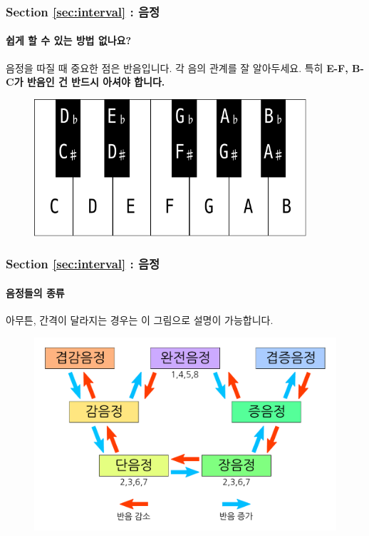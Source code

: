 \documentclass{beamer}
\begin{document}
	\begin{frame}
		\frametitle{Section \ref{sec:interval} : 음정}
		\framesubtitle{쉽게 할 수 있는 방법 없나요?}
		음정을 따질 때 중요한 점은 반음입니다. 각 음의 관계를 잘 알아두세요. 특히 {\bf E-F, B-C가 반음인 건 반드시 아셔야 합니다.}
		\begin{figure}
			\centering
			\includegraphics[width=0.9\textwidth]{res/pdf/4/scale/keys.pdf}
		\end{figure}
	\end{frame}
	
	\begin{frame}
		\frametitle{Section \ref{sec:interval} : 음정}
		\framesubtitle{음정들의 종류}
		아무튼, 간격이 달라지는 경우는 이 그림으로 설명이 가능합니다.
		\begin{figure}
			\centering
			\includegraphics[width=\textwidth]{res/pdf/6/interval/relationship.pdf}
		\end{figure}
	\end{frame}
	
\end{document}
